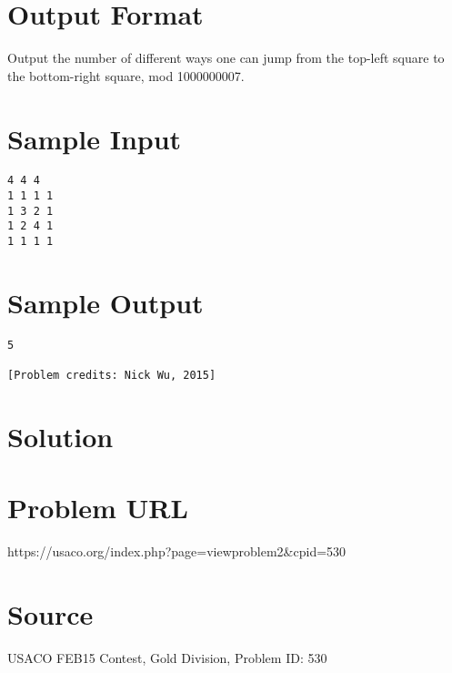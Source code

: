 \documentclass[12pt]{article}
\begin{document}
\section*{Output Format}
Output the number of different ways one can jump from the top-left square to the bottom-right square, mod 1000000007.

\section*{Sample Input}
\begin{verbatim}
4 4 4
1 1 1 1
1 3 2 1
1 2 4 1
1 1 1 1
\end{verbatim}

\section*{Sample Output}
\begin{verbatim}
5

[Problem credits: Nick Wu, 2015]
\end{verbatim}

\section*{Solution}


\section*{Problem URL}
https://usaco.org/index.php?page=viewproblem2&cpid=530

\section*{Source}
USACO FEB15 Contest, Gold Division, Problem ID: 530
\end{document}
